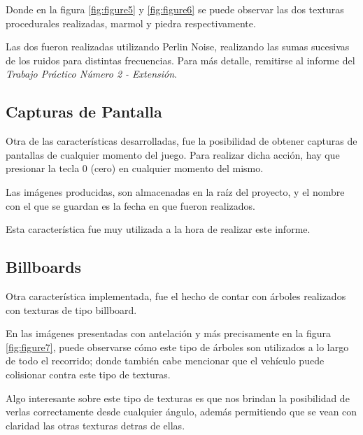 \documentclass[a4paper,10pt]{article}
\begin{document}
Donde en la figura \ref{fig:figure5} y \ref{fig:figure6} se puede observar las
dos texturas procedurales realizadas, marmol y piedra respectivamente.

Las dos fueron realizadas utilizando Perlin Noise, realizando las sumas
sucesivas de los ruidos para distintas frecuencias.  Para más detalle,
remitirse al informe del \textit{Trabajo Práctico Número 2 - Extensión}.

\subsection{Capturas de Pantalla}

Otra de las características desarrolladas, fue la posibilidad de obtener
capturas de pantallas de cualquier momento del juego.  Para realizar dicha
acción, hay que presionar la tecla $0$ (cero) en cualquier momento del mismo.

Las imágenes producidas, son almacenadas en la raíz del proyecto, y el nombre
con el que se guardan es la fecha en que fueron realizados.

Esta característica fue muy utilizada a la hora de realizar este informe.

\subsection{Billboards}

Otra característica implementada, fue el hecho de contar con árboles realizados
con texturas de tipo billboard.

En las imágenes presentadas con antelación y más precisamente en la figura
\ref{fig:figure7}, puede observarse cómo este tipo de árboles son utilizados a
lo largo de todo el recorrido; donde también cabe mencionar que el vehículo
puede colisionar contra este tipo de texturas.

Algo interesante sobre este tipo de texturas es que nos brindan la posibilidad
de verlas correctamente desde cualquier ángulo, además permitiendo que se vean
con claridad las otras texturas detras de ellas.
\end{document}

